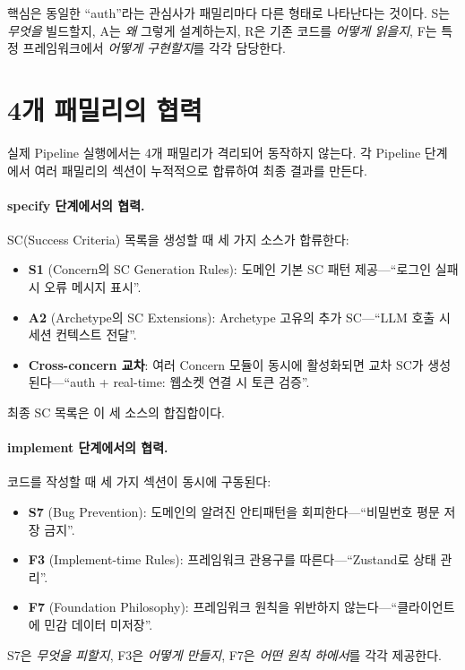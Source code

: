 \documentclass[11pt,a4paper,openright,twoside]{report}
\begin{document}
\medskip
핵심은 동일한 ``auth''라는 관심사가 패밀리마다 다른 형태로 나타난다는 것이다. S는 \emph{무엇을} 빌드할지, A는 \emph{왜} 그렇게 설계하는지, R은 기존 코드를 \emph{어떻게 읽을지}, F는 특정 프레임워크에서 \emph{어떻게 구현할지}를 각각 담당한다.


\section{4개 패밀리의 협력}
\label{sec:family-collaboration}

실제 Pipeline 실행에서는 4개 패밀리가 격리되어 동작하지 않는다. 각 Pipeline 단계에서 여러 패밀리의 섹션이 누적적으로 합류하여 최종 결과를 만든다.

\paragraph{specify 단계에서의 협력.}
SC(Success Criteria) 목록을 생성할 때 세 가지 소스가 합류한다:
\begin{itemize}
  \item \textbf{S1} (Concern의 SC Generation Rules): 도메인 기본 SC 패턴 제공---``로그인 실패 시 오류 메시지 표시''.
  \item \textbf{A2} (Archetype의 SC Extensions): Archetype 고유의 추가 SC---``LLM 호출 시 세션 컨텍스트 전달''.
  \item \textbf{Cross-concern 교차}: 여러 Concern 모듈이 동시에 활성화되면 교차 SC가 생성된다---``auth + real-time: 웹소켓 연결 시 토큰 검증''.
\end{itemize}
최종 SC 목록은 이 세 소스의 합집합이다.

\paragraph{implement 단계에서의 협력.}
코드를 작성할 때 세 가지 섹션이 동시에 구동된다:
\begin{itemize}
  \item \textbf{S7} (Bug Prevention): 도메인의 알려진 안티패턴을 회피한다---``비밀번호 평문 저장 금지''.
  \item \textbf{F3} (Implement-time Rules): 프레임워크 관용구를 따른다---``Zustand로 상태 관리''.
  \item \textbf{F7} (Foundation Philosophy): 프레임워크 원칙을 위반하지 않는다---``클라이언트에 민감 데이터 미저장''.
\end{itemize}
S7은 \emph{무엇을 피할지}, F3은 \emph{어떻게 만들지}, F7은 \emph{어떤 원칙 하에서}를 각각 제공한다.
\end{document}

